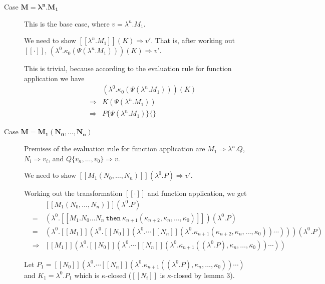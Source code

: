 \documentclass[a4paper,11pt,draft]{article}
\newcommand{\kw}[1]{\mathtt{#1}}
\begin{document}
\begin{description}
\item[\sffamily Case $\boldsymbol{M = \lambda^{n}.M_{1}}$]\hfill

  This is the base case, where $v = \lambda^{n}.M_{1}$.

  We need to show $[\![\lambda^{n}.M_{1}]\!] (K) \Rightarrow v'$. That is, after
  working out $[\![\cdot]\!]$,
  $(\lambda^{0}.\kappa_{0}(\Psi(\lambda^{n}.M_{1}))) (K) \Rightarrow v'$.

  This is trivial, because according to the evaluation rule for
  function application we have
  \begin{eqnarray*}
   &             & (\lambda^{0}.\kappa_{0}(\Psi(\lambda^{n}.M_{1}))) (K) \\
   & \Rightarrow & K (\Psi(\lambda^{n}.M_{1})) \\
   & \Rightarrow & P\{\Psi(\lambda^{n}.M_{1})\}\{\}
  \end{eqnarray*}

\item[\sffamily Case $\boldsymbol{M = M_{1}(N_{0}, \ldots, N_{n})}$]\hfill

Premises of the evaluation rule for function application are
$M_{1} \Rightarrow \lambda^{n}.Q$, $N_{i} \Rightarrow v_{i}$,
and $Q\{v_{n}, \ldots, v_{0}\} \Rightarrow v$.

We need to show $[\![M_{1}(N_{0}, \ldots, N_{n})]\!](\lambda^{0}.P) \Rightarrow v'$.

Working out the transformation $[\![\cdot]\!]$ and function application,
we get
\begin{eqnarray*}
&   & [\![M_{1}(N_{0}, \ldots, N_{n})]\!] (\lambda^{0}.P) \\
& = & (\lambda^{0}.[\![M_{1}.N_{0} \ldots N_{n} \: \kw{then} \: \kappa_{n+1}(\kappa_{n+2}, \kappa_{n}, \ldots, \kappa_{0})]\!]) (\lambda^{0}.P) \\
& = & (\lambda^{0}.[\![M_{1}]\!](\lambda^{0}.[\![N_{0}]\!](\lambda^{0}. \cdots [\![N_{n}]\!](\lambda^{0}.\kappa_{n+1}(\kappa_{n+2}, \kappa_{n}, \ldots, \kappa_{0})) \cdots ))) (\lambda^{0}.P) \\
& \Rightarrow & [\![M_{1}]\!](\lambda^{0}.[\![N_{0}]\!](\lambda^{0}. \cdots [\![N_{n}]\!](\lambda^{0}.\kappa_{n+1}((\lambda^{0}.P), \kappa_{n}, \ldots, \kappa_{0})) \cdots ))
\end{eqnarray*}

Let $P_{1} = [\![N_{0}]\!](\lambda^{0}. \cdots [\![N_{n}]\!](\lambda^{0}.\kappa_{n+1}((\lambda^{0}.P), \kappa_{n}, \ldots, \kappa_{0})) \cdots )$ and $K_{1} = \lambda^{0}.P_{1}$ which is $\kappa$-closed ($[\![N_{i}]\!]$ is $\kappa$-closed by lemma 3).


\end{description}
\end{document}
